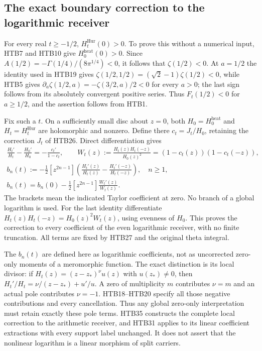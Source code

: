 \subsection{The exact boundary correction to the logarithmic receiver}

For every real $t\ge-1/2$, $H_t^{\mathrm{Hur}}(0)>0$. To prove this
without a numerical input, HTB7 and HTB10 give
$H_0^{\mathrm{heat}}(0)>0$. Since
$A(1/2)=-\Gamma(1/4)/(8\pi^{1/4})<0$, it follows that
$\zeta(1/2)<0$. At $a=1/2$ the identity used in HTB19 gives
$\zeta(1/2,1/2)=(\sqrt2-1)\zeta(1/2)<0$, while HTB5 gives
$\partial_a\zeta(1/2,a)=-\zeta(3/2,a)/2<0$ for every $a>0$;
the last sign follows from its absolutely convergent positive series.
Thus $F_t(1/2)<0$ for $a\ge1/2$, and the assertion follows from HTB1.

Fix such a $t$. On a sufficiently small disc about $z=0$, both
$H_0=H_0^{\mathrm{heat}}$ and $H_t=H_t^{\mathrm{Hur}}$ are
holomorphic and nonzero. Define there $c_t=J_t/H_0$, retaining the
correction $J_t$ of HTB26. Direct differentiation gives
\begin{equation}\tag{HTB35}
\begin{gathered}
 \frac{H_t'}{H_t}-\frac{H_0'}{H_0}
     =-\frac{c_t'}{1-c_t},\qquad
 W_t(z):=\frac{H_t(z)H_t(-z)}{H_0(z)^2}
     =(1-c_t(z))(1-c_t(-z)),\\
 b_n(t):=-\frac12[z^{2n-1}]
       \left(\frac{H_t'(z)}{H_t(z)}-
             \frac{H_t'(-z)}{H_t(-z)}\right),\quad n\ge1,\\
 b_n(t)=b_n(0)-\frac12[z^{2n-1}]\frac{W_t'(z)}{W_t(z)}.
\end{gathered}
\end{equation}
The brackets mean the indicated Taylor coefficient at zero. No branch
of a global logarithm is used. For the last identity differentiate
$H_t(z)H_t(-z)=H_0(z)^2W_t(z)$, using evenness of $H_0$. This proves
the correction to every coefficient of the even logarithmic receiver,
with no finite truncation. All terms are fixed by HTB27 and the
original theta integral.

The $b_n(t)$ are defined here as logarithmic coefficients, not as
uncorrected zero-only moments of a meromorphic function. The exact
distinction is its local divisor: if
$H_t(z)=(z-z_*)^{\nu}u(z)$ with $u(z_*)\ne0$, then
$H_t'/H_t=\nu/(z-z_*)+u'/u$. A zero of multiplicity $m$ contributes
$\nu=m$ and an actual pole contributes $\nu=-1$. HTB18--HTB20 specify
all those negative contributions and every cancellation. Thus any
global zero-only interpretation must retain exactly these pole
terms. HTB35 constructs the complete local correction to the
arithmetic receiver, and HTB31 applies to its linear coefficient
extractions with every support label unchanged. It does not assert
that the nonlinear logarithm is a linear morphism of split carriers.
